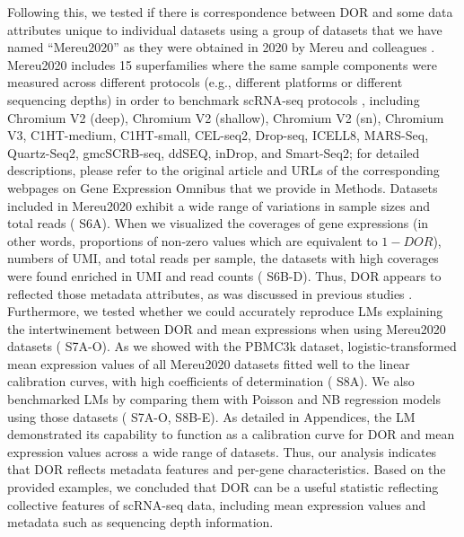 \documentclass{article}
\begin{document}
Following this, we tested if there is correspondence between DOR and some data attributes unique to individual 
datasets using a group of datasets that we have named ``Mereu2020'' as they were obtained in 2020 by Mereu 
and colleagues \cite{mereu2020benchmarking}. Mereu2020 includes 15 superfamilies where the same sample components were measured across 
different protocols (e.g., different platforms or different sequencing depths) in order to benchmark scRNA-seq 
protocols \cite{mereu2020benchmarking}, including Chromium V2 (deep), Chromium V2 (shallow), Chromium V2 (sn), Chromium V3, C1HT-medium, 
C1HT-small, CEL-seq2, Drop-seq, ICELL8, MARS-Seq, Quartz-Seq2, gmcSCRB-seq, ddSEQ, inDrop, 
and Smart-Seq2; for detailed descriptions, please refer to the original article \cite{mereu2020benchmarking} and URLs of the corresponding 
webpages on Gene Expression Omnibus that we provide in Methods. Datasets included in Mereu2020 exhibit a 
wide range of variations in sample sizes and total reads (\figurename{ S6A}). When we visualized the coverages of gene 
expressions (in other words, proportions of non-zero values which are equivalent to $1-DOR$), numbers of \ac{UMI}, 
and total reads per sample, the datasets with high coverages were found enriched in UMI and read counts (\figurename{ S6B-D}). Thus, DOR appears to reflected those metadata attributes, as was discussed in previous studies \cite{qiu2020embracing, zappia2017splatter}. Furthermore, we tested whether we could accurately reproduce LMs explaining the intertwinement 
between DOR and mean expressions when using Mereu2020 datasets (\figurename{ S7A-O}). As we showed with the 
PBMC3k dataset, logistic-transformed mean expression values of all Mereu2020 datasets fitted well to the linear 
calibration curves, with high coefficients of determination (\figurename{ S8A}). We also benchmarked LMs by 
comparing them with Poisson and NB regression models using those datasets (\figurename{ S7A-O, S8B-E}). As detailed 
in Appendices, the LM demonstrated its capability to function as a calibration curve for DOR and mean expression values 
across a wide range of datasets. Thus, our analysis indicates that DOR reflects metadata features and per-gene characteristics. 
Based on the provided examples, we concluded that DOR can be a useful statistic reflecting 
collective features of scRNA-seq data, including mean expression values and metadata such as sequencing depth 
information.
\end{document}
